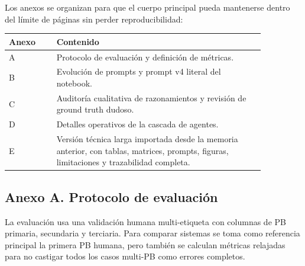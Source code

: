 Los anexos se organizan para que el cuerpo principal pueda mantenerse dentro del límite de páginas sin perder reproducibilidad:

\begin{center}
\scriptsize
\setlength{\tabcolsep}{4pt}
\renewcommand{\arraystretch}{1.15}
\begin{tabular}{p{0.16\linewidth}p{0.70\linewidth}}
\toprule
Anexo & Contenido \\
\midrule
A & Protocolo de evaluación y definición de métricas. \\
B & Evolución de prompts y prompt v4 literal del notebook. \\
C & Auditoría cualitativa de razonamientos y revisión de ground truth dudoso. \\
D & Detalles operativos de la cascada de agentes. \\
E & Versión técnica larga importada desde la memoria anterior, con tablas, matrices, prompts, figuras, limitaciones y trazabilidad completa. \\
\bottomrule
\end{tabular}
\end{center}

\subsection*{Anexo A. Protocolo de evaluación}

La evaluación usa una validación humana multi-etiqueta con columnas de PB primaria, secundaria y terciaria. Para comparar sistemas se toma como referencia principal la primera PB humana, pero también se calculan métricas relajadas para no castigar todos los casos multi-PB como errores completos.

